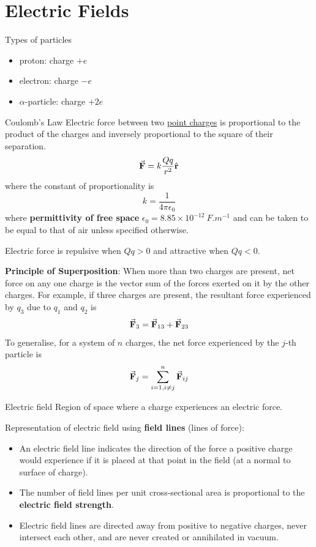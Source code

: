 \section{Electric Fields}
Types of particles
\begin{itemize}
\item proton: charge $+e$
\item electron: charge $-e$
\item $\alpha$-particle: charge $+2e$
\end{itemize}

\begin{defn}{Coulomb’s Law}{}
Electric force between two \underline{point charges} is proportional to the product of the charges and inversely proportional to the square of their separation.
\begin{equation}
\va{F} = k\frac{Qq}{r^2}\hat{\vb{r}}
\end{equation}
where the constant of proportionality is 
\[ k=\frac{1}{4\pi\epsilon_0} \]
where \textbf{permittivity of free space} $\epsilon_0 = 8.85 \times 10^{-12}\:\unit{F.m^{-1}}$ and can be taken to be equal to that of air unless specified otherwise.
\end{defn}

\begin{remark}
Electric force is repulsive when $Qq>0$ and attractive when $Qq<0$.
\end{remark}

\textbf{Principle of Superposition}: When more than two charges are
present, net force on any one charge is the vector sum of the forces exerted on it by the other charges. For example, if three charges are present, the resultant force experienced by $q_3$ due to $q_1$ and $q_2$ is
\[ \va{F}_3 = \va{F}_{13} + \va{F}_{23} \]
To generalise, for a system of $n$ charges, the net force experienced by the $j$-th particle is
\[ \va{F}_j = \sum_{i=1,i\neq j}^n\va{F}_{ij} \]

\begin{defn}{Electric field}{}
Region of space where a charge experiences an electric force.
\end{defn}

Representation of electric field using \textbf{field lines} (lines of force):
\begin{itemize}
\item An electric field line indicates the direction of the force a positive charge would experience if it is placed at that point in the field (at a normal to surface of charge).
\item The number of field lines per unit cross-sectional area is proportional to the \textbf{electric field strength}.
\item Electric field lines are directed away from positive to negative charges, never intersect each other, and are never created or annihilated in vacuum.
\end{itemize}

